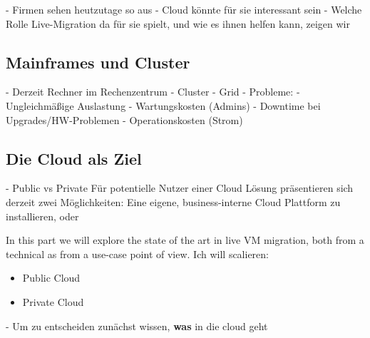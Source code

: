 \documentclass[draft,journal]{IEEEtran}
\begin{document}

- Firmen sehen heutzutage so aus
- Cloud könnte für sie interessant sein
- Welche Rolle Live-Migration da für sie spielt, und wie es ihnen
helfen kann, zeigen wir

\subsection{Mainframes und Cluster}
- Derzeit Rechner im Rechenzentrum
- Cluster
- Grid
- Probleme:
  - Ungleichmäßige Auslastung
  - Wartungskosten (Admins)
  - Downtime bei Upgrades/HW-Problemen
  - Operationskosten (Strom)

\subsection{Die Cloud als Ziel}
\label{sec:sota}
- Public vs Private
Für potentielle Nutzer einer Cloud Lösung präsentieren sich derzeit
zwei Möglichkeiten: Eine eigene, business-interne Cloud Plattform zu
installieren, oder 

In this part we will explore the state of the art in live VM
migration, both from a technical as from a use-case point of view.
Ich will scalieren:
\begin{itemize}
\item Public Cloud
\item Private Cloud
\end{itemize}
- Um zu entscheiden zunächst wissen, {\bf was} in die cloud geht
\end{document}
